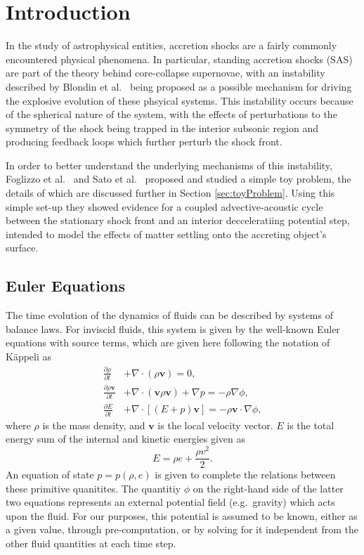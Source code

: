 \newcommand{\package}{\emph}

\chapter{Introduction}

In the study of astrophysical entities, accretion shocks are a fairly commonly encountered physical phenomena. In particular, standing accretion shocks (SAS) are part of the theory behind core-collapse supernovae, with an instability described by Blondin et al.\ \cite{Blondin2003} being proposed as a possible mechanism for driving the explosive evolution of these phsyical systems. This instability occurs because of the spherical nature of the system, with the effects of perturbations to the symmetry of the shock being trapped in the interior subsonic region and producing feedback loops which further perturb the shock front.

In order to better understand the underlying mechanisms of this instability, Foglizzo et al.\ \cite{Foglizzo2009} and Sato et al.\ \cite{Sato2009} proposed and studied a simple toy problem, the details of which are discussed further in Section \ref{sec:toyProblem}. Using this simple set-up they showed evidence for a coupled advective-acoustic cycle between the stationary shock front and an interior decceleratiing potential step, intended to model the effects of matter settling onto the accreting object's surface.


\section{Euler Equations}
\label{sec:euler}

The time evolution of the dynamics of fluids can be described by systems of balance laws. For inviscid fluids, this system is given by the well-known Euler equations with source terms, which are given here following the notation of K\"appeli \cite{Kappeli2014} as
\begin{align} \label{eq:euler}
\frac{\partial{\rho}}{\partial{t}} &+ \nabla \cdot (\rho \mathbf{v}) = 0,\\
\frac{\partial{\rho \mathbf{v}}}{\partial{t}} &+ \nabla \cdot (\mathbf{v} \rho \mathbf{v}) + \nabla p = -\rho \nabla \phi,\\
\frac{\partial{E}}{\partial{t}} &+ \nabla \cdot \left[(E+p)\mathbf{v}\right] = -\rho \mathbf{v} \cdot \nabla \phi,
\end{align}
where $\rho$ is the mass density, and $\mathbf{v}$ is the local velocity vector. $E$ is the total energy sum of the internal and kinetic energies given as $$E=\rho e + \frac{\rho v^2}{2}.$$  An equation of state $p=p(\rho,e)$ is given to complete the relations between these primitive quanitites. The quantitiy $\phi$ on the right-hand side of the latter two equations represents an external potential field (e.g.\ gravity) which acts upon the fluid. For our purposes, this potential is assumed to be known, either as a given value, through pre-computation, or by solving for it independent from the other fluid quantities at each time step.

